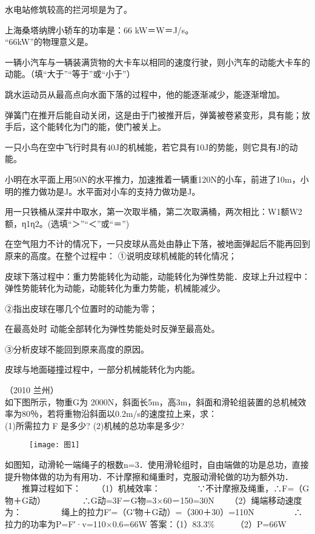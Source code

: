 \documentclass[12pt]{exam}
\begin{document}
\begin{questions}
\question
水电站修筑较高的拦河坝是为了\answerline*[增加水的势能]。

\question
上海桑塔纳牌小轿车的功率是：66 kW＝\answerline*[66000]W＝\answerline*[66000]J/s。\\“66kW”的物理意义是\answerline*[1秒钟做的功是66000J]。

\question
一辆小汽车与一辆装满货物的大卡车以相同的速度行驶，则小汽车的动能\answerline*[小于]大卡车的动能。（填“大于”“等于”或“小于”）

\question
跳水运动员从最高点向水面下落的过程中，他的\answerline*[势]能逐渐减少，\answerline*[动]能逐渐增加。

\question
弹簧门在推开后能自动关闭，这是由于门被推开后，弹簧被卷紧变形，具有\answerline*[弹性势]能；放手后，这个能转化为门的\answerline*[动]能，使门被关上。

\question
一只小鸟在空中飞行时具有40J的机械能，若它具有10J的势能，则它具有\answerline*[30]J的动能。

\question
小明在水平面上用50N的水平推力，加速推着一辆重120N的小车，前进了10m，小明的推力做功是\answerline*[500]J。水平面对小车的支持力做功是\answerline*[0]J。

\question
用一只铁桶从深井中取水，第一次取半桶，第二次取满桶，两次相比：W1额\answerline*[=]W2额，η1\answerline*[<]η2。(选填“＞”“＜”或“＝”)

\question
在空气阻力不计的情况下，一只皮球从高处由静止下落，被地面弹起后不能再回到原来的高度。在整个过程中：
①说明皮球机械能的转化情况；
\begin{solutionorbox}[6ex]
皮球下落过程中：重力势能转化为动能，动能转化为弹性势能．皮球上升过程中：弹性势能转化为动能，动能转化为重力势能，机械能减少。
\end{solutionorbox}

②指出皮球在哪几个位置时的动能为零；
\begin{solutionorbox}[6ex]
在最高处时 动能全部转化为弹性势能处时反弹至最高处。
\end{solutionorbox}

③分析皮球不能回到原来高度的原因。
\begin{solutionorbox}[6ex]
皮球与地面碰撞过程中，一部分机械能转化为内能。
\end{solutionorbox}

\question
（2010 兰州）\\
如下图所示，物重G为 2000N，斜面长5m，高3m，斜面和滑轮组装置的总机械效率为80％，若将重物沿斜面以0.2m/s的速度拉上来，求：\\
(1)所需拉力 F 是多少? (2)机械的总功率是多少?
\begin{figure}[H]
\texttt{[image: 图1]}
\end{figure}
\begin{solution}[30ex]
如图知，动滑轮一端绳子的根数n=3．使用滑轮组时，自由端做的功是总功，直接提升物体做的功为有用功．不计摩擦和绳重时，克服动滑轮做的功为额外功．
　　推算过程如下：
　　（1）机械效率：
　　　　∵不计摩擦及绳重，∴F=（G物＋G动）
　　　　∴G动=3F－G物=3×60－150=30N
　　（2）绳端移动速度为：
　　　　 绳上的拉力F′=（G′物＋G动）=（300＋30）=110N
　　　　 ∴拉力的功率为P=F′·v=110×0.6=66W
答案：（1）83.3\%　　　（2）P=66W
\end{solution}



\end{questions}
\end{document}
